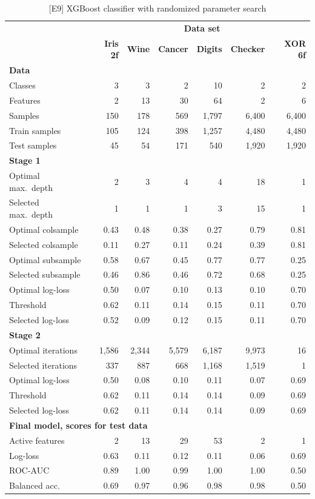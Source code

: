\begin{table}
\caption{[E9] XGBoost classifier with randomized parameter search}
\label{tab_e9}
%
\begin{center}
\small
\begin{tabular}{|lrrrrrr|}
\hline
&\multicolumn{6}{c|}{\textbf{\hrulefill\ Data set \hrulefill}}\\
&\textbf{Iris 2f}&\textbf{Wine}&\textbf{Cancer}&\textbf{Digits}&\textbf{Checker}&\textbf{XOR 6f}\\
\multicolumn{7}{|l|}{\textbf{Data}}\\
Classes&3&3&2&10&2&2\\
Features&2&13&30&64&2&6\\
Samples&150&178&569&1,797&6,400&6,400\\
Train samples&105&124&398&1,257&4,480&4,480\\
Test samples&45&54&171&540&1,920&1,920\\
\multicolumn{7}{|l|}{\textbf{Stage 1}}\\
Optimal max.\ depth&2&3&4&4&18&1\\
Selected max.\ depth&1&1&1&3&15&1\\
Optimal colsample&0.43&0.48&0.38&0.27&0.79&0.81\\
Selected colsample&0.11&0.27&0.11&0.24&0.39&0.81\\
Optimal subsample&0.58&0.67&0.45&0.77&0.77&0.25\\
Selected subsample&0.46&0.86&0.46&0.72&0.68&0.25\\
Optimal log-loss&0.50&0.07&0.10&0.13&0.10&0.70\\
Threshold&0.62&0.11&0.14&0.15&0.11&0.70\\
Selected log-loss&0.52&0.09&0.12&0.15&0.11&0.70\\
\multicolumn{7}{|l|}{\textbf{Stage 2}}\\
Optimal iterations&1,586&2,344&5,579&6,187&9,973&16\\
Selected iterations&337&887&668&1,168&1,519&1\\
Optimal log-loss&0.50&0.08&0.10&0.11&0.07&0.69\\
Threshold&0.62&0.11&0.14&0.14&0.09&0.69\\
Selected log-loss&0.62&0.11&0.14&0.14&0.09&0.69\\
\multicolumn{7}{|l|}{\textbf{Final model, scores for test data}}\\
Active features&2&13&29&53&2&1\\
Log-loss&0.63&0.11&0.12&0.11&0.06&0.69\\
ROC-AUC&0.89&1.00&0.99&1.00&1.00&0.50\\
Balanced acc.&0.69&0.97&0.96&0.98&0.98&0.50\\
\hline
\end{tabular}
\end{center}
\end{table}

